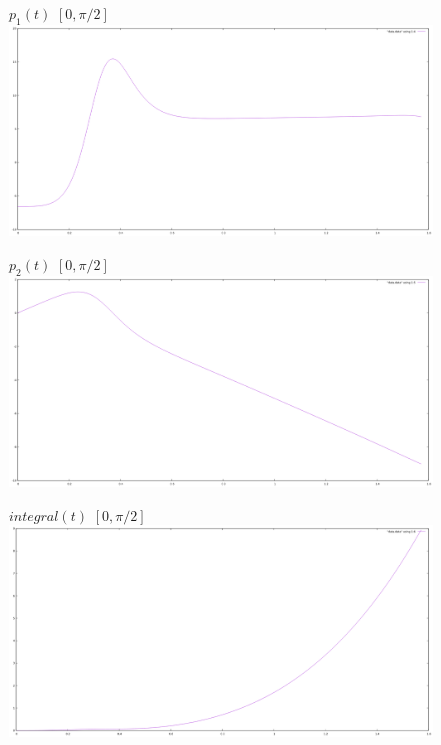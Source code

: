 \documentclass[titlepage]{article}
\begin{document}
\begin{figure}[h!]
$p_1(t)$ $[0, \pi/2]$\\
\centering
\includegraphics[width=1\linewidth]{p_110(t).png} 
\end{figure}
\begin{figure}[h!]
$p_2(t)$ $[0, \pi/2]$\\
\centering
\includegraphics[width=1\linewidth]{p_210(t).png} 
\end{figure}
\begin{figure}[h!]
$integral(t)$ $[0, \pi/2]$ \\
\centering
\includegraphics[width=1\linewidth]{integral10(t).png} 
\end{figure}
\end{document}

